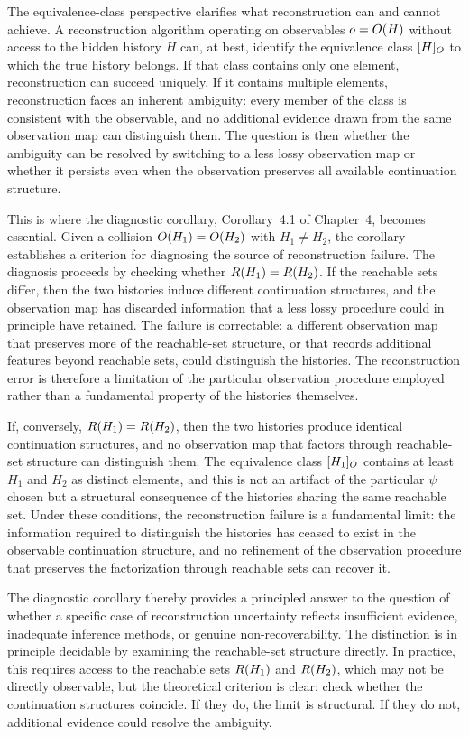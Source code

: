 The equivalence-class perspective clarifies what reconstruction can and cannot achieve. A reconstruction algorithm operating on observables $o = O(H)$ without access to the hidden history $H$ can, at best, identify the equivalence class $[H]_{O}$ to which the true history belongs. If that class contains only one element, reconstruction can succeed uniquely. If it contains multiple elements, reconstruction faces an inherent ambiguity: every member of the class is consistent with the observable, and no additional evidence drawn from the same observation map can distinguish them. The question is then whether the ambiguity can be resolved by switching to a less lossy observation map or whether it persists even when the observation preserves all available continuation structure.

This is where the diagnostic corollary, Corollary~4.1 of Chapter~4, becomes essential. Given a collision $O(H_1) = O(H_2)$ with $H_1 \neq H_2$, the corollary establishes a criterion for diagnosing the source of reconstruction failure. The diagnosis proceeds by checking whether $R(H_1) = R(H_2)$. If the reachable sets differ, then the two histories induce different continuation structures, and the observation map has discarded information that a less lossy procedure could in principle have retained. The failure is correctable: a different observation map that preserves more of the reachable-set structure, or that records additional features beyond reachable sets, could distinguish the histories. The reconstruction error is therefore a limitation of the particular observation procedure employed rather than a fundamental property of the histories themselves.

If, conversely, $R(H_1) = R(H_2)$, then the two histories produce identical continuation structures, and no observation map that factors through reachable-set structure can distinguish them. The equivalence class $[H_1]_{O}$ contains at least $H_1$ and $H_2$ as distinct elements, and this is not an artifact of the particular $\psi$ chosen but a structural consequence of the histories sharing the same reachable set. Under these conditions, the reconstruction failure is a fundamental limit: the information required to distinguish the histories has ceased to exist in the observable continuation structure, and no refinement of the observation procedure that preserves the factorization through reachable sets can recover it.

The diagnostic corollary thereby provides a principled answer to the question of whether a specific case of reconstruction uncertainty reflects insufficient evidence, inadequate inference methods, or genuine non-recoverability. The distinction is in principle decidable by examining the reachable-set structure directly. In practice, this requires access to the reachable sets $R(H_1)$ and $R(H_2)$, which may not be directly observable, but the theoretical criterion is clear: check whether the continuation structures coincide. If they do, the limit is structural. If they do not, additional evidence could resolve the ambiguity.

